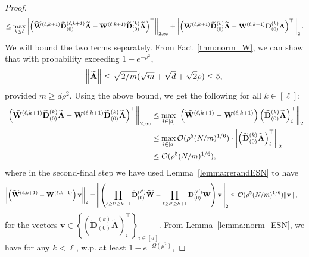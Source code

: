 \begin{proof}
\begin{align*}
		\le \max_{k \le \ell} \norm{\left(\widetilde{\mathbf{W}}^{(\ell, k+1)} \widetilde{\mathbf{D}}_{(0)}^{(\ell, k+1)} \widetilde{\mathbf{A}} - \mathbf{W}^{(\ell, k+1)} \widetilde{\mathbf{D}}_{(0)}^{(k)} \widetilde{\mathbf{A}}\right)^{\top}}_{2, \infty} + \norm{\left(\mathbf{W}^{(\ell, k+1)} \widetilde{\mathbf{D}}_{(0)}^{(k)} \widetilde{\mathbf{A}} - \mathbf{W}^{(\ell, k+1)} \mathbf{D}_{(0)}^{(k)} \mathbf{A} \right)^{\top}}_{2}.
	\end{align*}
	\endgroup     
	We will bound the two terms separately. 
	From Fact~\ref{thm:norm_W}, we can show that with probability exceeding $1 - e^{-\rho^2}$,
	\begin{align}
		\norm{\widetilde{\mathbf{A}}} \le  \sqrt{2/m}(\sqrt{m} + \sqrt{d} + \sqrt{2}\rho) \le 5 \label{eq:normtildeA},
	\end{align}
	provided $m \ge d\rho^2$. 
	Using the above bound, we get the following for all $k \in [\ell]$:
	\begin{align*}
		\norm{\left(\widetilde{\mathbf{W}}^{(\ell, k+1)} \widetilde{\mathbf{D}}_{(0)}^{(k)} \widetilde{\mathbf{A}} - \mathbf{W}^{(\ell, k+1)} \widetilde{\mathbf{D}}_{(0)}^{(k)} \widetilde{\mathbf{A}}\right)^{\top}}_{2, \infty} &\le \max_{i \in [d]} \norm{\left(\widetilde{\mathbf{W}}^{(\ell, k+1)}  - \mathbf{W}^{(\ell, k+1)} \right) \left(\widetilde{\mathbf{D}}_{(0)}^{(k)} \widetilde{\mathbf{A}}\right)^{\top}_i}_2 \\&
		\le \max_{i \in [d]} \mathcal{O}(\rho^5 (N/m)^{1/6})  \cdot \norm{ \left(\widetilde{\mathbf{D}}_{(0)}^{(k)} \widetilde{\mathbf{A}}\right)^{\top}_i}_2 \\&
		\le \mathcal{O}(\rho^5 (N/m)^{1/6}), 
	\end{align*}
	where in the second-final step we have used Lemma~\ref{lemma:rerandESN} to have
	\begin{align*}
		\norm{\left(\widetilde{\mathbf{W}}^{(\ell, k+1)} - \mathbf{W}^{(\ell, k+1)}\right) \mathbf{v}}_2 &= \norm{ \left(\prod_{\ell \ge \ell' \ge k + 1} \widetilde{\mathbf{D}}_{(0)}^{(\ell')} \widetilde{\mathbf{W}}  - \prod_{\ell \ge \ell' \ge k + 1} \mathbf{D}_{(0)}^{(\ell')} \mathbf{W} \right) \mathbf{v} }_2 \le  \mathcal{O}(\rho^5 (N/m)^{1/6}) \norm{\mathbf{v}},
	\end{align*}
	for the vectors $\mathbf{v} \in \left\{\left(\widetilde{\mathbf{D}}_{(0)}^{(k)} \widetilde{\mathbf{A}}\right)^{\top}_i\right\}_{i \in [d]}$. 
	From Lemma~\ref{lemma:norm_ESN}, we have for any $k < \ell$, w.p. at least $1-e^{-\Omega(\rho^2)}$,

\end{proof}
